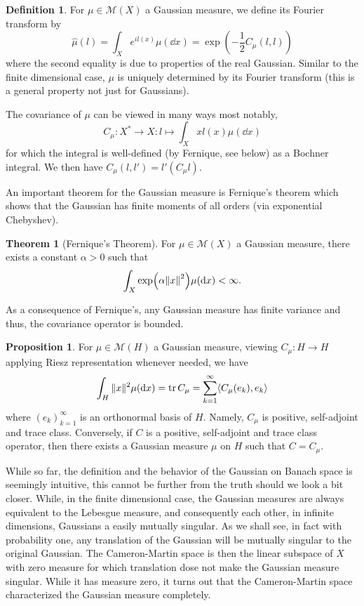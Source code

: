 \documentclass[]{article}
\theoremstyle{definition}
\newtheorem{theorem}{Theorem}
\theoremstyle{definition}
\newtheorem{definition}{Definition}[section]
\newtheorem{proposition}{Proposition}[section]
\begin{document}
\begin{definition}
  For \(\mu \in \mathcal{M}(X)\) a Gaussian measure, we define its Fourier transform by 
  \[\hat \mu(l) = \int_X e^{il(x)} \mu(\dd x) = \exp \left(-\frac{1}{2} C_\mu(l, l)\right)\]
  where the second equality is due to properties of the real Gaussian. Similar to the finite dimensional 
  case, \(\mu\) is uniquely determined by its Fourier transform (this is a general property not just for Gaussians).
\end{definition}

The covariance of \(\mu\) can be viewed in many ways most notably, 
\[C_\mu : X^* \to X : l \mapsto \int_X x l(x) \mu(\dd x)\]
for which the integral is well-defined (by Fernique, see below) as a Bochner integral. 
We then have \(C_\mu(l, l') = l'(C_\mu l)\).

An important theorem for the Gaussian measure is Fernique's theorem which shows that the Gaussian has 
finite moments of all orders (via exponential Chebyshev).

\begin{theorem}[Fernique's Theorem]
  For \(\mu \in \mathcal{M}(X)\) a Gaussian measure, there exists a constant \(\alpha > 0\) such that 
  \[\int_X \exp(\alpha \norm{x}^2) \mu(\dd x) < \infty.\]
\end{theorem}

As a consequence of Fernique's, any Gaussian measure has finite variance and thus, the covariance operator
is bounded. 

\begin{proposition}
  For \(\mu \in \mathcal{M}(H)\) a Gaussian measure, viewing \(C_\mu : H \to H\) applying Riesz representation 
  whenever needed, we have 
  \[\int_H \|x\|^2 \mu(\dd x) = \tr C_\mu = \sum_{k = 1}^\infty \langle C_\mu(e_k), e_k\rangle\]
  where \((e_k)_{k = 1}^\infty\) is an orthonormal basis of \(H\). Namely, \(C_\mu\) is 
  positive, self-adjoint and trace class. Conversely, if \(C\) is a positive, self-adjoint and trace class 
  operator, then there exists a Gaussian measure \(\mu\) on \(H\) such that \(C = C_\mu\).
\end{proposition}

While so far, the definition and the behavior of the Gaussian on Banach space is seemingly intuitive, 
this cannot be further from the truth should we look a bit closer. While, in the finite dimensional case,
the Gaussian measures are always equivalent to the Lebesgue measure, and consequently each other, 
in infinite dimensions, Gaussians a easily mutually singular. As we shall see, in fact with probability 
one, any translation of the Gaussian will be mutually singular to the original Gaussian. The 
Cameron-Martin space is then the linear subspace of \(X\) with zero measure for which translation 
dose not make the Gaussian measure singular. While it has measure zero, it turns out that the 
Cameron-Martin space characterized the Gaussian measure completely.
\end{document}
